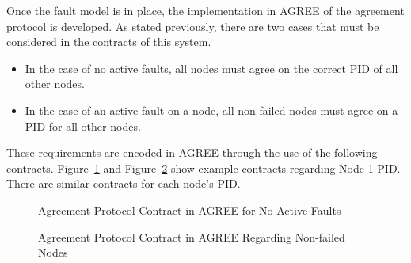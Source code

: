 Once the fault model is in place, the implementation in AGREE of the agreement protocol is developed. As stated previously, there are two cases that must be considered in the contracts of this system. 
\begin{itemize}
	\item In the case of no active faults, all nodes must agree on the correct PID of all other nodes. 
	\item In the case of an active fault on a node, all non-failed nodes must agree on a PID for all other nodes. 
\end{itemize}

These requirements are encoded in AGREE through the use of the following contracts. Figure~\ref{fig:PIDContract1} and Figure~\ref{fig:PIDContract2} show example contracts regarding Node 1 PID. There are similar contracts for each node's PID. 
\begin{figure}[!htb]
        \caption{\label{fig:PIDContract1} Agreement Protocol Contract in AGREE for No Active Faults}
\end{figure}

\begin{figure}[!htb]
        \caption{\label{fig:PIDContract2} Agreement Protocol Contract in AGREE Regarding Non-failed Nodes}
\end{figure}


